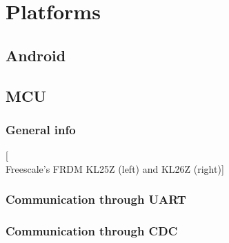 \chapter{Platforms}

\section{Android}

\section{MCU}
\subsection{General info}

[\\Freescale's FRDM KL25Z (left) and KL26Z (right)]



\subsection{Communication through UART}

\subsection{Communication through CDC}

